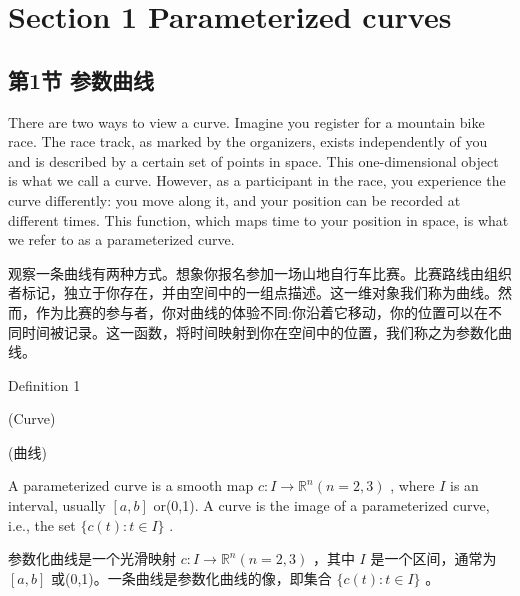 \section*{Section 1 Parameterized curves}

\begin{tcolorbox}
\section*{第1节 参数曲线}
\end{tcolorbox}

There are two ways to view a curve. Imagine you register for a mountain bike race. The race track, as marked by the organizers, exists independently of you and is described by a certain set of points in space. This one-dimensional object is what we call a curve. However, as a participant in the race, you experience the curve differently: you move along it, and your position can be recorded at different times. This function, which maps time to your position in space, is what we refer to as a parameterized curve.

\begin{tcolorbox}
观察一条曲线有两种方式。想象你报名参加一场山地自行车比赛。比赛路线由组织者标记，独立于你存在，并由空间中的一组点描述。这一维对象我们称为曲线。然而，作为比赛的参与者，你对曲线的体验不同:你沿着它移动，你的位置可以在不同时间被记录。这一函数，将时间映射到你在空间中的位置，我们称之为参数化曲线。
\end{tcolorbox}

\HRule

Definition 1


(Curve)

\begin{tcolorbox}
(曲线)
\end{tcolorbox}

\HRule

A parameterized curve is a smooth map \(c : I \rightarrow  {\mathbb{R}}^{n}\left( {n = 2,3}\right)\) , where \(I\) is an interval, usually \(\left\lbrack  {a,b}\right\rbrack\) or(0,1). A curve is the image of a parameterized curve, i.e., the set \(\{ c\left( t\right)  : t \in  I\}\) .

\begin{tcolorbox}
参数化曲线是一个光滑映射 \(c : I \rightarrow  {\mathbb{R}}^{n}\left( {n = 2,3}\right)\) ，其中 \(I\) 是一个区间，通常为 \(\left\lbrack  {a,b}\right\rbrack\) 或(0,1)。一条曲线是参数化曲线的像，即集合 \(\{ c\left( t\right)  : t \in  I\}\) 。
\end{tcolorbox}

